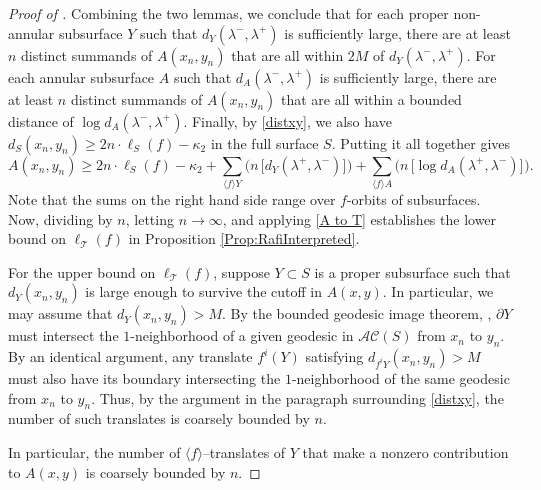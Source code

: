 \documentclass[11pt,letterpaper]{amsart}
\newcommand{\bdy}{\partial} %
\newcommand{\teich}{\mathcal T}
\numberwithin{equation}{section}
\theoremstyle{definition}
\newcommand{\AC}{\mathcal{AC}}
\begin{document}
\begin{proof}[Proof of ]
Combining the two lemmas, we conclude that for each proper non-annular subsurface $Y$ such that $d_Y(\lambda^{-}, \lambda^{+})$ is sufficiently large, there are at least $n$ distinct summands of $A(x_{n}, y_{n})$ that are all within $2M$ of $d_{Y}(\lambda^{-}, \lambda^{+})$. For each annular subsurface $A$ such that $d_A(\lambda^{-}, \lambda^{+})$ is sufficiently large, there are at least $n$ distinct summands of $A(x_{n}, y_{n})$ that are all within a bounded distance of $\log d_{A}(\lambda^{-}, \lambda^{+})$. Finally, by \eqref{distxy}, we also have  $d_S(x_{n}, y_{n}) \geq 2n \cdot \ell_{S}(f) - \kappa_{2}$ in the full surface $S$.
Putting it all together gives
\[ A(x_{n}, y_{n})  \geq  
2n \cdot \ell_{S}(f) - \kappa_{2}  +   \sum_{\langle f \rangle Y} \Big( n \,  \big[ d_Y(\lambda^+,\lambda^-) \big]_{}  \Big) +  \sum_{\langle f \rangle A} \Big( n \,  \big[ \log d_A(\lambda^+,\lambda^-) \big]_{} \Big).  \]
Note that the sums on the right hand side range over $f$-orbits of subsurfaces.   
Now, dividing by $n$, letting $n \to \infty$, and applying \eqref{A to T} establishes the lower bound on $\ell_{\teich}(f)$ in Proposition \ref{Prop:RafiInterpreted}. 


For the upper bound on $\ell_{\teich}(f)$, suppose $Y \subset S$ is a proper subsurface such that $d_{Y}(x_{n}, y_{n})$ is large enough to survive the cutoff in $A(x,y)$. In particular, we may assume that  $d_{Y}(x_{n}, y_{n})> M$.
By the bounded geodesic image theorem, , $\bdy Y$ must intersect the $1$-neighborhood of a given geodesic in $\AC(S)$ from $x_{n}$ to $y_{n}$. By an identical argument, any translate $f^i(Y)$ satisfying $d_{f^i Y}(x_{n}, y_{n})> M$ must also have its boundary intersecting the $1$-neighborhood of the same geodesic from $x_{n}$ to $y_{n}$. Thus, by the argument in the paragraph surrounding \eqref{distxy}, the number of such translates is coarsely bounded by $n$.

 In particular, the number of $\langle f \rangle$--translates of $Y$ that make a nonzero contribution to $A(x,y)$ is coarsely bounded by $n$.


\end{proof}
\end{document}
